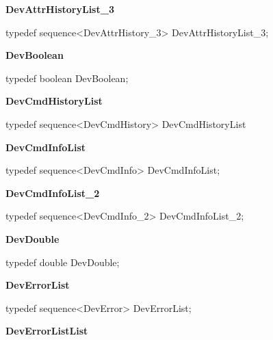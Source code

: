 \begin{flushleft}
\textbf{DevAttrHistoryList\_3}
\par\end{flushleft}

typedef sequence<DevAttrHistory\_3> DevAttrHistoryList\_3;\\


\begin{flushleft}
\textbf{DevBoolean}
\par\end{flushleft}

typedef boolean DevBoolean;\\


\begin{flushleft}
\textbf{DevCmdHistoryList}
\par\end{flushleft}

typedef sequence<DevCmdHistory> DevCmdHistoryList\\


\begin{flushleft}
\textbf{DevCmdInfoList}
\par\end{flushleft}

typedef sequence<DevCmdInfo> DevCmdInfoList;\\


\begin{flushleft}
\textbf{DevCmdInfoList\_2}
\par\end{flushleft}

typedef sequence<DevCmdInfo\_2> DevCmdInfoList\_2;\\


\begin{flushleft}
\textbf{DevDouble}
\par\end{flushleft}

typedef double DevDouble;\\


\begin{flushleft}
\textbf{DevErrorList}
\par\end{flushleft}

typedef sequence<DevError> DevErrorList;\\


\begin{flushleft}
\textbf{DevErrorListList}
\par\end{flushleft}

